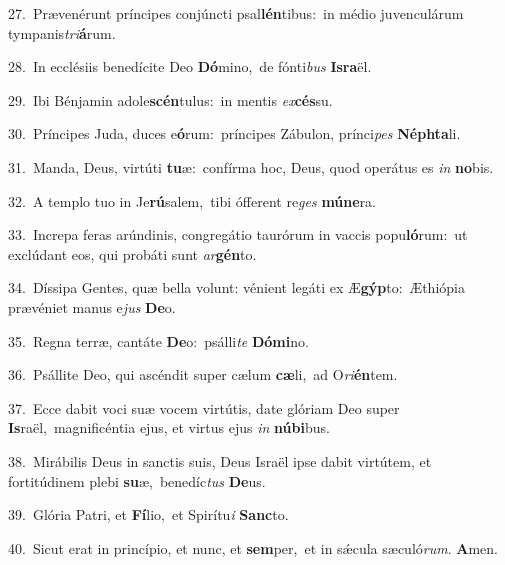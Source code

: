 {\numbfont\textcolor{\numbcolor}{27.}}~Prævenérunt príncipes conjúncti psal\-\textbf{lén}\-tibus:~\star in médio juvenculárum tympanis\-\textit{tri}\-\textbf{á}rum.\par
{\numbfont\textcolor{\numbcolor}{28.}}~In ecclésiis benedícite Deo \textbf{Dó}\-mino,~\star de fónti\textit{bus} \textbf{Is}\-\textbf{ra}ël.\par
{\numbfont\textcolor{\numbcolor}{29.}}~Ibi Bénjamin adole\-\textbf{scén}\-tulus:~\star in mentis \textit{ex}\-\textbf{cés}su.\par
{\numbfont\textcolor{\numbcolor}{30.}}~Príncipes Juda, duces e\-\textbf{ó}\-rum:~\star príncipes Zábulon, prínci\textit{pes} \textbf{Néph}\-\textbf{ta}li.\par
{\numbfont\textcolor{\numbcolor}{31.}}~Manda, Deus, virtúti \textbf{tu}\-æ:~\star confírma hoc, Deus, quod operátus es \textit{in} \textbf{no}\-bis.\par
{\numbfont\textcolor{\numbcolor}{32.}}~A templo tuo in Je\-\textbf{rú}\-salem,~\star tibi ófferent re\textit{ges} \textbf{mú}\-\textbf{ne}ra.\par
{\numbfont\textcolor{\numbcolor}{33.}}~Increpa feras arúndinis, congregátio taurórum in vaccis popu\-\textbf{ló}\-rum:~\star ut exclúdant eos, qui probáti sunt \textit{ar}\-\textbf{gén}to.\par
{\numbfont\textcolor{\numbcolor}{34.}}~Díssipa Gentes, quæ bella volunt: vénient legáti ex Æ\-\textbf{gýp}\-to:~\star Æthiópia prævéniet manus e\textit{jus} \textbf{De}\-o.\par
{\numbfont\textcolor{\numbcolor}{35.}}~Regna terræ, cantáte \textbf{De}\-o:~\star psálli\textit{te} \textbf{Dó}\-\textbf{mi}no.\par
{\numbfont\textcolor{\numbcolor}{36.}}~Psállite Deo, qui ascéndit super cælum \textbf{cæ}\-li,~\star ad O\-\textit{ri}\-\textbf{én}tem.\par
{\numbfont\textcolor{\numbcolor}{37.}}~Ecce dabit voci suæ vocem virtútis, date glóriam Deo super \textbf{Is}\-raël,~\star magnificéntia ejus, et virtus ejus \textit{in} \textbf{nú}\-\textbf{bi}bus.\par
{\numbfont\textcolor{\numbcolor}{38.}}~Mirábilis Deus in sanctis suis, Deus Israël ipse dabit virtútem, et fortitúdinem plebi \textbf{su}\-æ,~\star benedíc\textit{tus} \textbf{De}\-us.\par
{\numbfont\textcolor{\numbcolor}{39.}}~Glória Patri, et \textbf{Fí}\-lio,~\star et Spirítu\textit{i} \textbf{Sanc}\-to.\par
{\numbfont\textcolor{\numbcolor}{40.}}~Sicut erat in princípio, et nunc, et \textbf{sem}\-per,~\star et in sǽcula sæculó\-\textit{rum}\-. \textbf{A}\-men.\par
